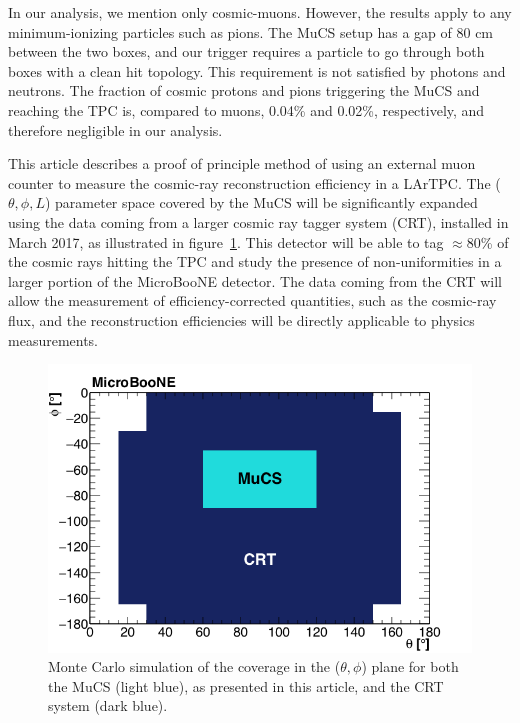 \documentclass[a4paper,11pt]{article}
\begin{document}
In our analysis, we mention only cosmic-muons. However, the results apply to any minimum-ionizing particles such as pions. The MuCS setup has a gap of 80 cm between the two boxes, and our trigger requires a particle to go through both boxes with a clean hit topology. This requirement is not satisfied by photons and neutrons. The fraction of cosmic protons and pions triggering the MuCS and reaching the TPC is, compared to muons, 0.04\% and 0.02\%, respectively, and therefore negligible in our analysis.

This article describes a proof of principle method of using an external muon counter to measure the cosmic-ray reconstruction efficiency in a LArTPC. The ($\theta, \phi, L$) parameter space covered by the MuCS will be significantly expanded using the data coming from a larger cosmic ray tagger system (CRT), installed in March 2017, as illustrated in figure~\ref{fig:crt}. This detector will be able to tag $\approx$80\% of the cosmic rays hitting the TPC and study the presence of non-uniformities in a larger portion of the MicroBooNE detector. The data coming from the CRT will allow the measurement of efficiency-corrected quantities, such as the cosmic-ray flux, and the reconstruction efficiencies will be directly applicable to physics measurements.

\begin{figure}[htbp]
  \begin{center}
    \includegraphics[width=0.7\linewidth]{figures/crt.png}
    \caption{Monte Carlo simulation of the coverage in the ($\theta,\phi$) plane for both the MuCS (light blue), as presented in this article, and the CRT system (dark blue).} \label{fig:crt}
  \end{center}
\end{figure}
\end{document}
